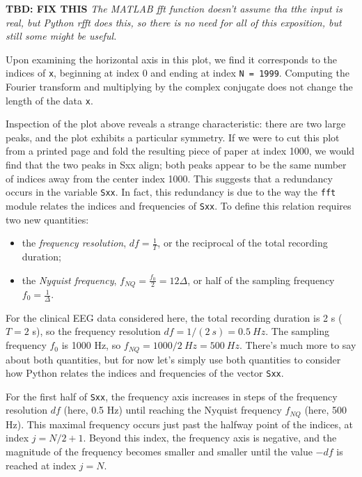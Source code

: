 \documentclass[11pt]{article}
\providecommand{\tightlist}{%
      \setlength{\itemsep}{0pt}\setlength{\parskip}{0pt}}
\begin{document}
    \textbf{TBD: FIX THIS} \emph{The MATLAB fft function doesn't assume tha
tthe input is real, but Python rfft does this, so there is no need for
all of this exposition, but still some might be useful.}

Upon examining the horizontal axis in this plot, we find it corresponds
to the indices of \texttt{x}, beginning at index 0 and ending at index
\texttt{N\ =\ 1999}. Computing the Fourier transform and multiplying by
the complex conjugate does not change the length of the data \texttt{x}.

Inspection of the plot above reveals a strange characteristic: there are
two large peaks, and the plot exhibits a particular symmetry. If we were
to cut this plot from a printed page and fold the resulting piece of
paper at index 1000, we would find that the two peaks in Sxx align; both
peaks appear to be the same number of indices away from the center index
1000. This suggests that a redundancy occurs in the variable
\texttt{Sxx}. In fact, this redundancy is due to the way the
\texttt{fft} module relates the indices and frequencies of \texttt{Sxx}.
To define this relation requires two new quantities:

\begin{itemize}
\tightlist
\item
  the \emph{frequency resolution}, \(df = \frac{1}{T}\), or the
  reciprocal of the total recording duration;
\item
  the \emph{Nyquist frequency},
  \(f_{NQ} = \frac{f_0}{2} = {1}{2\Delta}\), or half of the sampling
  frequency \(f_0 = \frac{1}{\Delta}\).
\end{itemize}

For the clinical EEG data considered here, the total recording duration
is 2 s (\(T = 2\) s), so the frequency resolution
\(df = 1 / (2\ s) = 0.5\ Hz\). The sampling frequency \(f_0\) is 1000
Hz, so \(f_{NQ} = 1000 / 2\ Hz = 500\ Hz\). There's much more to say
about both quantities, but for now let's simply use both quantities to
consider how Python relates the indices and frequencies of the vector
\texttt{Sxx}.

For the first half of \texttt{Sxx}, the frequency axis increases in
steps of the frequency resolution \(df\) (here, 0.5 Hz) until reaching
the Nyquist frequency \(f_{NQ}\) (here, 500 Hz). This maximal frequency
occurs just past the halfway point of the indices, at index
\(j = N/2 + 1\). Beyond this index, the frequency axis is negative, and
the magnitude of the frequency becomes smaller and smaller until the
value \(-df\) is reached at index \(j = N\).
\end{document}
